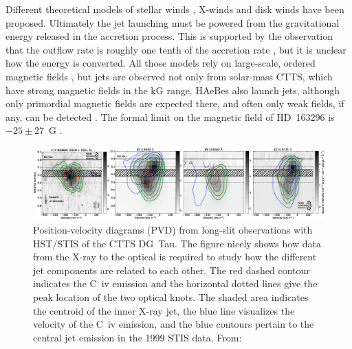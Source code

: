 \documentclass[12pt]{article}
\begin{document}
Different theoretical models of stellar winds \citep{1988ApJ...332L..41K,2005ApJ...632L.135M}, X-winds \citep{1994ApJ...429..781S} and disk winds \citep{1982MNRAS.199..883B,2005ApJ...630..945A} have been proposed. Ultimately the jet launching must be powered from the gravitational energy released in the accretion process. This is supported by the observation that the outflow rate is roughly one tenth of the accretion rate \citep{1990ApJ...354..687C,2008ApJ...689.1112C}, but it is unclear how the energy is converted.
All those models rely on large-scale, ordered magnetic fields \citep{2009pjc..book...99F}, but jets are observed not only from solar-mass CTTS, which have strong magnetic fields in the kG range. HAeBes also launch jets, although only primordial magnetic fields are expected there, and often only weak fields, if any, can be detected \citep{2007A&A...463.1039H,2007MNRAS.376.1145W}. The formal limit on the magnetic field of HD~163296 is $-25\pm 27$~G \citep{2007A&A...463.1039H}. 

\begin{figure}[htb]
\centering
\includegraphics[width=\textwidth]{aa18592-11-fig2.png}
\caption{Position-velocity diagrams (PVD) from long-slit observations with HST/STIS of the CTTS DG~Tau. The figure nicely shows how data from the X-ray to the optical is required to study how the different jet components are related to each other. The red dashed contour indicates the C~{\sc iv} emission and the horizontal dotted lines give the peak location of the two optical knots. The shaded area indicates the centroid of the inner X-ray jet, the blue line visualizes the velocity of the C~{\sc iv} emission, and the blue contours pertain to the central jet emission in the 1999 STIS data. From:}
\label{fig:CIV}
\end{figure}
\end{document}
